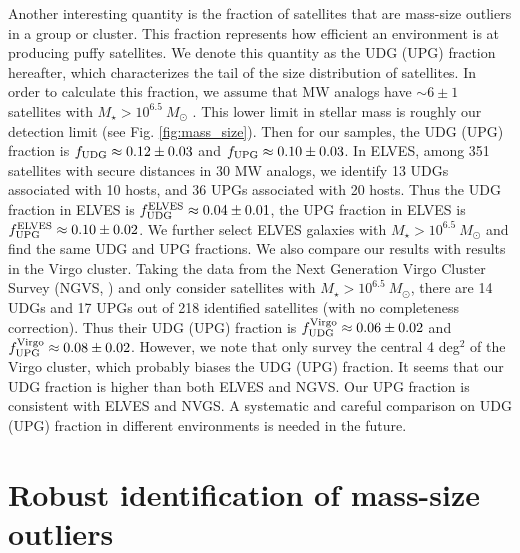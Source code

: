 \documentclass[twocolumn,astrosymb,twocolappendix]{aastex631}
\begin{document}
\begin{CJK*}{UTF8}{gbsn}
Another interesting quantity is the fraction of satellites that are mass-size outliers in a group or cluster. This fraction represents how efficient an environment is at producing puffy satellites. We denote this quantity as the UDG (UPG) fraction hereafter, which characterizes the tail of the size distribution of satellites. In order to calculate this fraction, we assume that MW analogs have $\sim 6 \pm 1$ satellites with $M_\star > 10^{6.5}\ M_\odot$ \citep{CarlstenELVES2022}. This lower limit in stellar mass is roughly our detection limit (see Fig. \ref{fig:mass_size}). Then for our samples, the UDG (UPG) fraction is $f_{\rm UDG} \approx 0.12 \pm 0.03$ and $f_{\rm UPG} \approx 0.10 \pm 0.03$. In ELVES, among 351 satellites with secure distances in 30 MW analogs, we identify 13 UDGs associated with 10 hosts, and 36 UPGs associated with 20 hosts. Thus the UDG fraction in ELVES is $f_{\rm UDG}^{\rm ELVES} \approx 0.04 \pm 0.01$, the UPG fraction in ELVES is $f_{\rm UPG}^{\rm ELVES} \approx 0.10 \pm 0.02$. We further select ELVES galaxies with $M_\star > 10^{6.5}\ M_\odot$ and find the same UDG and UPG fractions. We also compare our results with results in the Virgo cluster. Taking the data from the Next Generation Virgo Cluster Survey (NGVS, \citealt{Ferrarese2020}) and only consider satellites with $M_\star > 10^{6.5}\ M_\odot$, there are 14 UDGs and 17 UPGs out of 218 identified satellites (with no completeness correction). Thus their UDG (UPG) fraction is $f_{\rm UDG}^{\rm Virgo} \approx 0.06\pm 0.02$ and $f_{\rm UPG}^{\rm Virgo} \approx 0.08\pm 0.02$. However, we note that \citet{Ferrarese2020} only survey the central 4 deg$^2$ of the Virgo cluster, which probably biases the UDG (UPG) fraction. It seems that our UDG fraction is higher than both ELVES and NGVS. Our UPG fraction is consistent with ELVES and NVGS. A systematic and careful comparison on UDG (UPG) fraction in different environments is needed in the future. 


\section{Robust identification of mass-size outliers}\label{sec:discussion}



\end{CJK*}
\end{document}
